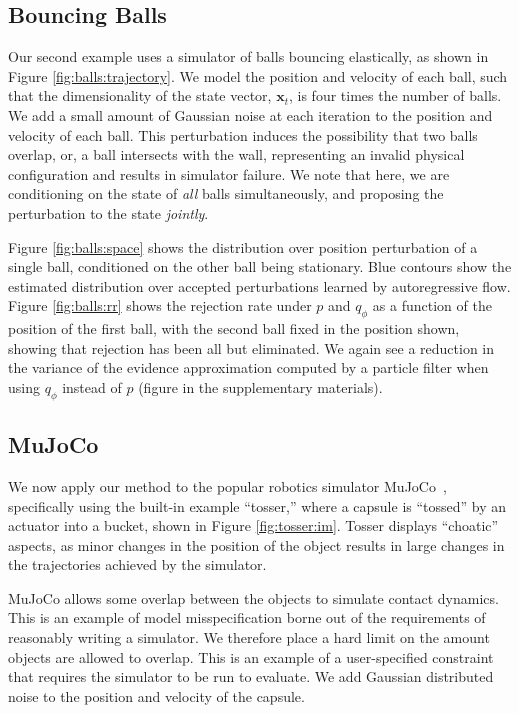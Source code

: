 \subsection{Bouncing Balls}
\label{sec:experiments:bb}
Our second example uses a simulator of balls bouncing elastically, as shown in Figure \ref{fig:balls:trajectory}.
We model the position and velocity of each ball, such that the dimensionality of the state vector, $\mathbf{x}_t$, is four times the number of balls.
We add a small amount of Gaussian noise at each iteration to the position and velocity of each ball.
This perturbation induces the possibility that two balls overlap, or, a ball intersects with the wall, representing an invalid physical configuration and results in simulator failure.
We note that here, we are conditioning on the state of \emph{all} balls simultaneously, and proposing the perturbation to the state \emph{jointly}.

Figure \ref{fig:balls:space} shows the distribution over position perturbation of a single ball, conditioned on the other ball being stationary.
Blue contours show the estimated distribution over accepted perturbations learned by autoregressive flow.
Figure \ref{fig:balls:rr} shows the rejection rate under $p$ and $q_{\phi}$ as a function of the position of the first ball, with the second ball fixed in the position shown, showing that rejection has been all but eliminated.
We again see a reduction in the variance of the evidence approximation computed by a particle filter when using $q_{\phi}$ instead of $p$ (figure in the supplementary materials).

\subsection{MuJoCo}
\label{sec:experiments:tosser}
We now apply our method to the popular robotics simulator MuJoCo~\citep{todorov2012mujoco}, specifically using the built-in example ``tosser,'' where a capsule is ``tossed'' by an actuator into a bucket, shown in Figure \ref{fig:tosser:im}.
Tosser displays ``choatic'' aspects, as minor changes in the position of the object results in large changes in the trajectories achieved by the simulator.

MuJoCo allows some overlap between the objects to simulate contact dynamics. 
This is an example of model misspecification borne out of the requirements of reasonably writing a simulator.
We therefore place a hard limit on the amount objects are allowed to overlap.
This is an example of a user-specified constraint that requires the simulator to be run to evaluate.
We add Gaussian distributed noise to the position and velocity of the capsule.

